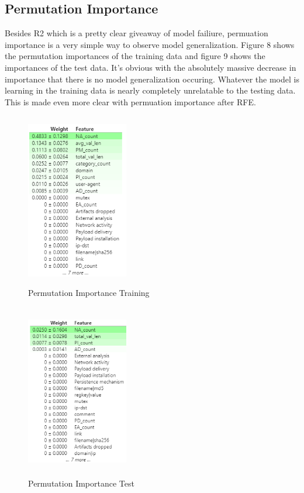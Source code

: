 \documentclass[conference]{IEEEtran}
\begin{document}
\subsection{Permutation Importance}
Besides R2 which is a pretty clear giveaway of model failiure, permuation importance is a very simple way to observe model generalization. Figure 8 shows the permutation importances of the training data and figure 9 shows the importances of the test data. It's obvious with the absolutely massive decrease in importance that there is no model generalization occuring. Whatever the model is learning in the training data is nearly completely unrelatable to the testing data. This is made even more clear with permuation importance after RFE.
\begin{figure}[h]
\centerline{\includegraphics[width=1.75in, height=3.0in]{pitrain.PNG}}
\caption{Permutation Importance Training}
\label{fig}
\end{figure}
\begin{figure}[h]
\centerline{\includegraphics[width=1.75in, height=3.0in]{pitest.PNG}}
\caption{Permutation Importance Test}
\label{fig}
\end{figure}
\end{document}
